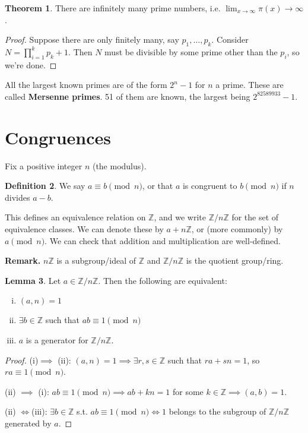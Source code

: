 \documentclass{article}
\theoremstyle{definition}
\newtheorem{theorem}{Theorem}[section]
\newtheorem{lemma}[theorem]{Lemma}
\newtheorem{defn}[theorem]{Definition}
\theoremstyle{remark}
\begin{document}
\begin{theorem}
    There are infinitely many prime numbers, i.e. ${\lim_{x \to \infty} \pi(x) \to \infty}$.
\end{theorem}
\begin{proof}
    Suppose there are only finitely many, say $p_1,\ldots, p_k$. Consider $N = \prod_{i=1}^{k} p_k + 1$. Then $N$ must be divisible by some prime other than the $p_i$, so we're done.
\end{proof}

All the largest known primes are of the form $2^n-1$ for $n$ a prime. These are called \textbf{Mersenne primes}. 51 of them are known, the largest being $2^{82589933}-1$.


\section{Congruences}

Fix a positive integer $n$ (the modulus).

\begin{defn}
    We say $a \equiv b \pmod{n}$, or that $a$ is congruent to $b \pmod{n}$ if $n$ divides $a-b$. 
\end{defn}

This defines an equivalence relation on $\mathbb{Z}$, and we write $\mathbb{Z}/n\mathbb{Z}$ for the set of equivalence classes. We can denote these by $a + n\mathbb{Z}$, or (more commonly) by ${a \pmod{n}}$. We can check that addition and multiplication are well-defined.

\vspace{1mm}

\textbf{Remark.} $n\mathbb{Z}$ is a subgroup/ideal of $\mathbb{Z}$ and $\mathbb{Z}/n\mathbb{Z}$ is the quotient group/ring.

\begin{lemma}
    Let $a \in \mathbb{Z}/n\mathbb{Z}$. Then the following are equivalent:
    \begin{enumerate}[(i)]
        \item $(a,n) = 1$
        \item $\exists b \in \mathbb{Z}$ such that $ab \equiv 1 \pmod{n}$
        \item $a$ is a generator for $\mathbb{Z}/n\mathbb{Z}$.
    \end{enumerate}
\end{lemma}
\begin{proof}
    (i)$\implies $ (ii): $(a,n)=1 \implies \exists r,s \in \mathbb{Z}$ such that $ra + sn = 1$, so $ra \equiv 1 \pmod{n}$.

    (ii) $\implies $ (i): $ab \equiv 1 \pmod{n} \implies ab + kn = 1$ for some $k \in \mathbb{Z} \implies {(a,b)=1}$.

    (ii) $\iff $(iii): $\exists b \in \mathbb{Z}$ s.t. $ab \equiv 1\pmod{n} \iff 1$ belongs to the subgroup of $\mathbb{Z}/n\mathbb{Z}$ generated by $a$.
\end{proof}
\end{document}

